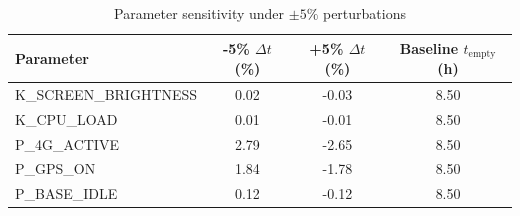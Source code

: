 \begin{table}[htbp]
\centering
\caption{Parameter sensitivity under $\pm5\%$ perturbations}
\label{tab:param_sensitivity}
\begin{tabular}{lccc}
\hline
Parameter & -5\% $\Delta t$ (\%) & +5\% $\Delta t$ (\%) & Baseline $t_{\mathrm{empty}}$ (h)\\
\hline
K_SCREEN_BRIGHTNESS & 0.02 & -0.03 & 8.50\\
K_CPU_LOAD & 0.01 & -0.01 & 8.50\\
P_4G_ACTIVE & 2.79 & -2.65 & 8.50\\
P_GPS_ON & 1.84 & -1.78 & 8.50\\
P_BASE_IDLE & 0.12 & -0.12 & 8.50\\
\hline
\end{tabular}
\end{table}

